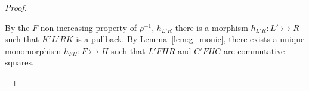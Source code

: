 \begin{proof}
\begin{itemize}
     By the $F$-non-increasing property of $\rho^{-1}$,  
     $h_{L'R}$ 
     there is a morphism $h_{L'R}:L' \rightarrowtail R$ such that $K'L'RK$ is a pullback.
        By Lemma~\ref{lem:g_monic}, there exists a unique monomorphism $h_{FH}:F \rightarrowtail H$ such that $L'FHR$ and $C'FHC$ are commutative squares.


\end{itemize}
\end{proof}
